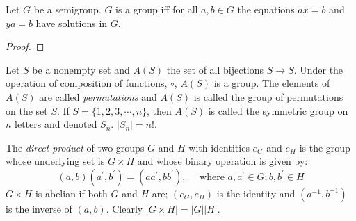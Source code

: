 \begin{Proposition}
	Let $ G $ be a semigroup. $ G $ is a group iff for all $ a,b\in G $ the equations $ ax=b $ and $ ya=b $ have solutions in $ G $.
\end{Proposition}
\begin{proof}
	\exercise
\end{proof}

\begin{Example}
	Let $ S $ be a nonempty set and $ A(S) $ the set of all bijections $ S \to S $. Under the operation of composition of functions, $ \circ $, $ A(S) $ is a group. The elements of $ A(S) $ are called \textit{permutations} and $ A(S) $ is called the group of permutations on the set $ S $. If $ S=\{1,2,3,\cdots,n\} $, then $ A(S) $ is called the symmetric group on $ n $ letters and denoted $ S_n $. $ |S_n|=n! $.
\end{Example}
\begin{Definition}
	The \textit{direct product} of two groups $ G $ and $ H $ with identities $ e_G $ and $ e_H $ is the group whose underlying set is $ G \times H $ and whose binary operation is given by:
	\begin{equation}
		(a,b)(a^\prime,b^\prime)=(a a^\prime,b b^\prime),\quad \text{ where }a,a^\prime \in G;b, b^\prime \in H\nonumber
	\end{equation}
	$ G \times H $ is abelian if both $ G $ and $ H $ are; $ (e_G,e_H) $ is the identity and $ (a^{-1},b^{-1}) $ is the inverse of $ (a,b) $. Clearly $ |G \times H|=|G||H| $.
\end{Definition}

